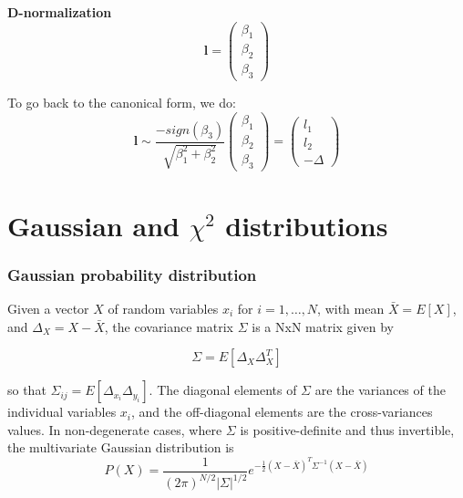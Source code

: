 \textbf{D-normalization}
\begin{equation}
    \textbf{l} = \left(\begin{array}{c}
        \beta_1 \\ \beta_2 \\ \beta_3
    \end{array}\right)
\end{equation}

To go back to the canonical form, we do:
\begin{equation}
    \textbf{l}\sim \frac{-sign(\beta_3)}{\sqrt{\beta_1^2+\beta_2^2}} \left(\begin{array}{c}
        \beta_1 \\ \beta_2 \\ \beta_3
    \end{array}\right)
    = \left(\begin{array}{c}
        l_1 \\ l_2 \\ -\Delta
    \end{array}\right)
\end{equation}



\section{Gaussian and $\chi^2$ distributions}
\subsubsection{Gaussian probability distribution}
Given a vector $X$ of random variables $x_i$ for $i=1,\dots,N$, with mean $\bar{X} = E[X]$, and $\Delta_X = X - \bar{X}$, the covariance matrix $\Sigma$ is a NxN matrix given by

\begin{equation}
    \Sigma = E[\Delta_X \Delta_X^T]
\end{equation}

so that $\Sigma_{ij}=E[\Delta_{x_i}\Delta_{y_i}]$. The diagonal elements of $\Sigma$ are the variances of the individual variables $x_i$, and the off-diagonal elements are the cross-variances values.
In non-degenerate cases, where $\Sigma$ is positive-definite and thus invertible, the multivariate Gaussian distribution is
\begin{equation}
P(X)=\frac{1}{(2\pi)^{N/2}|\Sigma|^{1/2}} e^{-\frac{1}{2}(X-\bar{X})^T \Sigma^{-1} (X-\bar{X})}
\end{equation}

